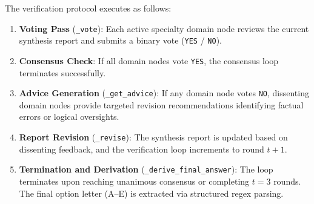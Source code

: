 The verification protocol executes as follows:
\begin{enumerate}
    \item \textbf{Voting Pass} (\texttt{\_vote}): Each active specialty domain node reviews the current synthesis report and submits a binary vote (\texttt{YES} / \texttt{NO}).
    \item \textbf{Consensus Check}: If all domain nodes vote \texttt{YES}, the consensus loop terminates successfully.
    \item \textbf{Advice Generation} (\texttt{\_get\_advice}): If any domain node votes \texttt{NO}, dissenting domain nodes provide targeted revision recommendations identifying factual errors or logical oversights.
    \item \textbf{Report Revision} (\texttt{\_revise}): The synthesis report is updated based on dissenting feedback, and the verification loop increments to round $t+1$.
    \item \textbf{Termination and Derivation} (\texttt{\_derive\_final\_answer}): The loop terminates upon reaching unanimous consensus or completing $t=3$ rounds. The final option letter (A--E) is extracted via structured regex parsing.
\end{enumerate}
